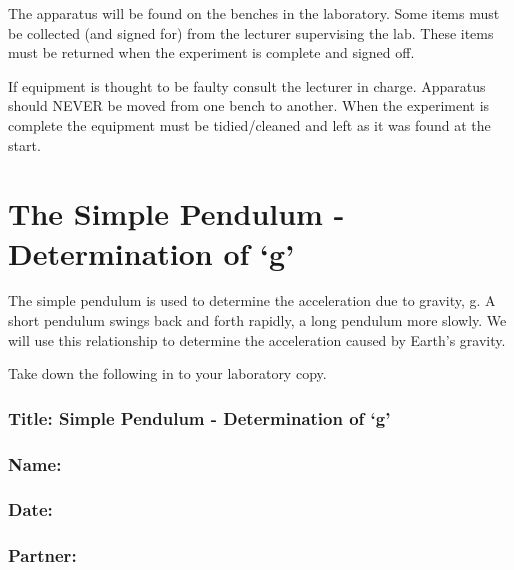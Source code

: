 \documentclass[
  letterpaper,
  DIV=11,
  numbers=noendperiod]{scrreprt}
\begin{document}

The apparatus will be found on the benches in the laboratory. Some items
must be collected (and signed for) from the lecturer supervising the
lab. These items must be returned when the experiment is complete and
signed off.

If equipment is thought to be faulty consult the lecturer in charge.
Apparatus should NEVER be moved from one bench to another. When the
experiment is complete the equipment must be tidied/cleaned and left as
it was found at the start.


\chapter{The Simple Pendulum - Determination of
`g'}\label{the-simple-pendulum---determination-of-g}

The simple pendulum is used to determine the acceleration due to
gravity, g. A short pendulum swings back and forth rapidly, a long
pendulum more slowly. We will use this relationship to determine the
acceleration caused by Earth's gravity.

Take down the following in to your laboratory copy.

\subsection*{\texorpdfstring{{Title: Simple Pendulum - Determination of
`g'}}{Title: Simple Pendulum - Determination of `g'}}\label{title-simple-pendulum---determination-of-g}

\subsection*{\texorpdfstring{{Name:}}{Name:}}\label{name}

\subsection*{\texorpdfstring{{Date:}}{Date:}}\label{date}

\subsection*{\texorpdfstring{{Partner:}}{Partner:}}\label{partner}
\end{document}
